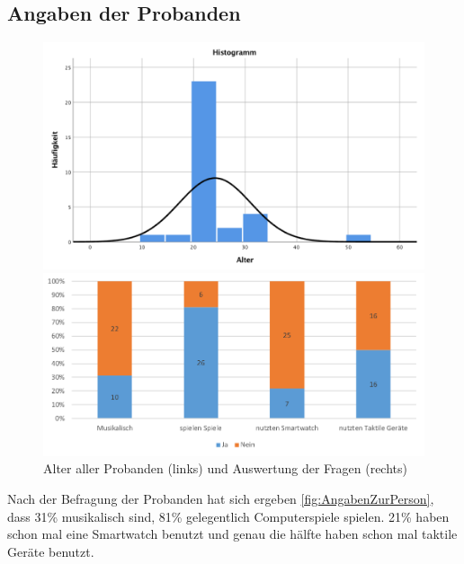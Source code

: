 
\subsection{Angaben der Probanden}

\begin{figure}[htbp] 
	\centering
	\begin{minipage}[t]{0.8\textwidth}
		\includegraphics[width=\textwidth]{pics/analyse/person/alter.png}
	\end{minipage}
	\begin{minipage}[t]{0.8\textwidth}
		\includegraphics[width=\textwidth]{pics/analyse/person/questions.png}
	\end{minipage}
	\caption{Alter aller Probanden (links) und Auswertung der Fragen (rechts)}
	\label{fig:AngabenZurPerson}
\end{figure}

Nach der Befragung der Probanden hat sich ergeben \autoref{fig:AngabenZurPerson}, dass 31\% musikalisch sind, 81\% gelegentlich Computerspiele spielen. 21\% haben schon mal eine Smartwatch benutzt und genau die h{\"a}lfte haben schon mal taktile Ger{\"a}te benutzt. 


